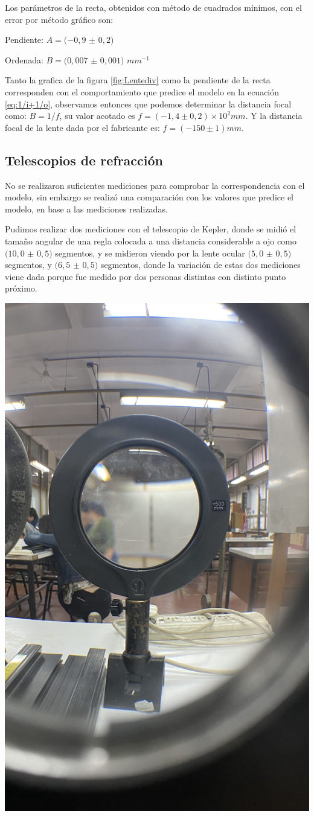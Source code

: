 \documentclass[a4paper,12pt]{article}
\newenvironment{Figure}
  {\par\medskip\noindent\minipage{\linewidth}}
  {\endminipage\par\medskip}
\begin{document}
\begin{multicols*}{2}
        Los parámetros de la recta, obtenidos con método de cuadrados mínimos, con el error por método gráfico son:

        Pendiente: $A=(-0,9$ $\pm$ $0,2)$

        Ordenada: $B=(0,007$ $\pm$ $0,001)$ $mm^{-1}$

        Tanto la grafica de la figura \ref{fig:Lentediv} como la pendiente de la recta corresponden con el comportamiento que predice el modelo en la ecuación \ref{eq:1/i+1/o}, observamos entonces que podemos determinar la distancia focal como: $B=1/f$, su valor acotado es $f=(-1,4 \pm 0,2) \times 10^{2} mm$. Y la distancia focal de la lente dada por el fabricante es: $f = (-150 \pm 1) mm$.

    \subsection*{Telescopios de refracción}

        No se realizaron suficientes mediciones para comprobar la correspondencia con el modelo, sin embargo se realizó una comparación con los valores que predice el modelo, en base a las mediciones realizadas.

        Pudimos realizar dos mediciones con el telescopio de Kepler, donde se midió el tamaño angular de una regla colocada a una distancia considerable a ojo como $(10,0$ $\pm$ $0,5)$ segmentos, y se midieron viendo por la lente ocular $(5,0$ $\pm$ $0,5)$ segmentos, y $(6,5$ $\pm$ $0,5)$ segmentos, donde la variación de estas dos mediciones viene dada porque fue medido por dos personas distintas con distinto punto próximo.

        \begin{Figure}
            \centering
            \includegraphics[width=0.5\linewidth]{MedTel.jpg}
            \label{f: MedTel}
        \end{Figure}


\end{multicols*}
\end{document}
